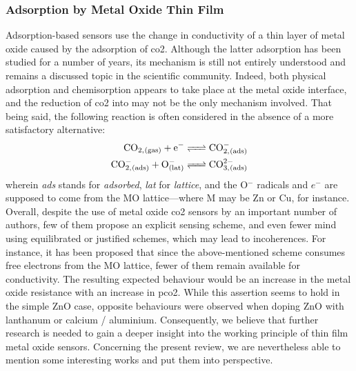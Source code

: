 \subsubsection{Adsorption by Metal Oxide Thin Film}\label{subsect:choos:review:metal_oxide}

Adsorption-based sensors use the change in conductivity of a thin layer of metal oxide caused by the adsorption of \gls{co2}. Although the latter adsorption has been studied for a number of years\cite{hotan1979, au1988, freund1996, seiferth1999, lopesmartins2004}, its mechanism is still not entirely understood and remains a discussed topic in the scientific community\cite{herran2009, noei2011, tang2013, usseinov2019}. Indeed, both physical adsorption and chemisorption appears to take place at the metal oxide interface, and the reduction of \gls{co2} into  may not be the only mechanism involved\cite{tang2013}. That being said, the following reaction is often considered in the absence of a more satisfactory alternative\cite{gankanda2016, colak2019, alvarez2020}:
\begin{equation}
	\begin{aligned}
		\ce{CO_{2,(gas)} + e^- &<=> CO^-_{2,(ads)}} \\
		\ce{CO^-_{2,(ads)} + O^-_{(lat)} &<=> CO^{2-}_{3,(ads)}}
	\end{aligned}
\end{equation}
wherein \emph{ads} stands for \emph{adsorbed}, \emph{lat} for \emph{lattice}, and the O$^-$ radicals and $e^-$ are supposed to come from the MO lattice---where M may be Zn or Cu, for instance. Overall, despite the use of metal oxide \gls{co2} sensors by an important number of authors, few of them propose an explicit sensing scheme, and even fewer mind using equilibrated or justified schemes, which may lead to incoherences. For instance, it has been proposed that since the above-mentioned scheme consumes free electrons from the MO lattice, fewer of them remain available for conductivity\cite{kannan2014}. The resulting expected behaviour would be an increase in the metal oxide resistance with an increase in \gls{pco2}. While this assertion seems to hold in the simple ZnO case\cite{haeusler1996, kannan2014, colak2019}, opposite behaviours were observed when doping ZnO with lanthanum\cite{jeong2016} or calcium / aluminium\cite{dhahri2017, ghosh2019}. Consequently, we believe that \mfrin{}further research is needed to gain a deeper insight into the working principle of thin film metal oxide sensors. Concerning the present review, we are nevertheless able to mention some interesting works and put them into perspective.

